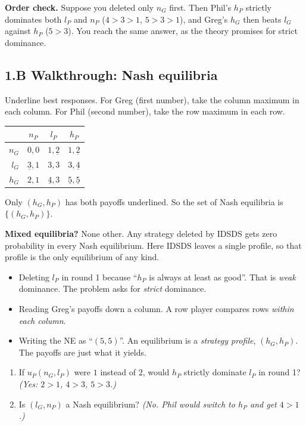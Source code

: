 \documentclass[11pt]{article}
\begin{document}
\textbf{Order check.} Suppose you deleted only $n_G$ first. Then Phil's $h_P$ strictly dominates both $l_P$ and $n_P$ ($4>3>1$, $5>3>1$), and Greg's $h_G$ then beats $l_G$ against $h_P$ ($5>3$). You reach the same answer, as the theory promises for strict dominance.

\subsection*{1.B Walkthrough: Nash equilibria}
Underline best responses. For Greg (first number), take the column maximum in each column. For Phil (second number), take the row maximum in each row.
\begin{center}
\begin{tabular}{r|ccc}
 & $n_P$ & $l_P$ & $h_P$ \\ \hline
$n_G$ & $0,0$ & $1,\underline{2}$ & $1,\underline{2}$ \\
$l_G$ & $\underline{3},1$ & $3,3$ & $3,\underline{4}$ \\
$h_G$ & $2,1$ & $\underline{4},3$ & $\underline{5},\underline{5}$
\end{tabular}
\end{center}
Only $(h_G,h_P)$ has both payoffs underlined. So the set of Nash equilibria is $\{(h_G,h_P)\}$.

\textbf{Mixed equilibria?} None other. Any strategy deleted by IDSDS gets zero probability in every Nash equilibrium. Here IDSDS leaves a single profile, so that profile is the only equilibrium of any kind.

\begin{pitfall}
\begin{itemize}
\item Deleting $l_P$ in round 1 because ``$h_P$ is always at least as good''. That is \emph{weak} dominance. The problem asks for \emph{strict} dominance.
\item Reading Greg's payoffs down a column. A row player compares rows \emph{within each column}.
\item Writing the NE as ``$(5,5)$''. An equilibrium is a \emph{strategy profile}, $(h_G,h_P)$. The payoffs are just what it yields.
\end{itemize}
\end{pitfall}

\begin{selfcheck}
\begin{enumerate}
\item If $u_P(n_G,l_P)$ were $1$ instead of $2$, would $h_P$ strictly dominate $l_P$ in round 1? \emph{(Yes: $2>1$, $4>3$, $5>3$.)}
\item Is $(l_G,n_P)$ a Nash equilibrium? \emph{(No. Phil would switch to $h_P$ and get $4>1$.)}
\end{enumerate}
\end{selfcheck}
\end{document}
